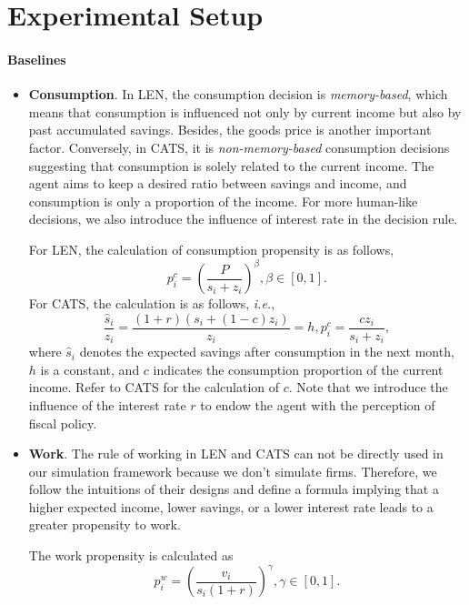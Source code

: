 \section{Experimental Setup}
\paragraph{Baselines}
\begin{itemize}[leftmargin=*]
    \item \textbf{Consumption}. In LEN, the consumption decision is \textit{memory-based}, which means that consumption is influenced not only by current income but also by past accumulated savings. Besides, the goods price is another important factor. Conversely, in CATS, it is \textit{non-memory-based} consumption decisions suggesting that consumption is solely related to the current income. The agent aims to keep a desired ratio between savings and income, and consumption is only a proportion of the income. For more human-like decisions, we also introduce the influence of interest rate in the decision rule.

    For LEN, the calculation of consumption propensity is as follows,
    \begin{equation}
        p_i^c = \left(\frac{P}{s_i+z_i}\right)^{\beta}, \beta\in [0, 1].
    \end{equation}
    For CATS, the calculation is as follows,
    \textit{i.e.},
    \begin{equation}
        \frac{\hat{s}_i}{z_i} = \frac{(1+r)(s_i + (1-c)z_i)}{z_i} = h, p_i^c = \frac{c z_i}{s_i + z_i},
    \end{equation}
    where $\hat{s}_i$ denotes the expected savings after consumption in the next month, $h$ is a constant, and $c$ indicates the consumption proportion of the current income. Refer to CATS for the calculation of $c$. Note that we introduce the influence of the interest rate $r$ to endow the agent with the perception of fiscal policy.

    \item \textbf{Work}. The rule of working in LEN and CATS can not be directly used in our simulation framework because we don't simulate firms. Therefore, we follow the intuitions of their designs and define a formula implying that a higher expected income, lower savings, or a lower interest rate leads to a greater propensity to work.

    The work propensity is calculated as
    \begin{equation}
        p^w_i = \left(\frac{v_i}{s_i(1+r)}\right)^{\gamma}, \gamma\in [0, 1].
    \end{equation}

\end{itemize}

